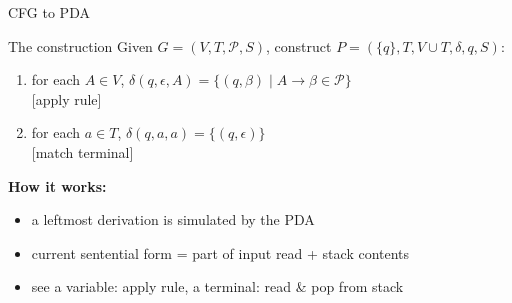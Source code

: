 \documentclass[handout]{beamer}
\begin{document}
\begin{frame}{CFG to PDA}

    \begin{block}{The construction}
        Given $G=(V,T,\mathcal P,S)$, construct $P=(\{q\},T,V\cup T,\delta,q,S)$:
        \begin{enumerate}[(1)]
            \item for each $ A\in V$, \alert{$\delta(q,\epsilon, A)=\{(q,\beta)\mid A\rightarrow \beta \in\mathcal P\}$} \\ \hfill [apply rule]
            \item for each $a\in T$, \alert{$\delta(q,a,a)=\{(q,\epsilon)\}$}\\ \hfill [match terminal]
        \end{enumerate}   
    \end{block} 

    \textbf{How it works:}
    \begin{itemize}
        \item a \alert{leftmost} derivation is simulated by the PDA
        \item current sentential form = part of input read + stack contents
        \item see a variable: apply rule, a terminal: read \& pop from stack
    \end{itemize}

\end{frame}
\end{document}
